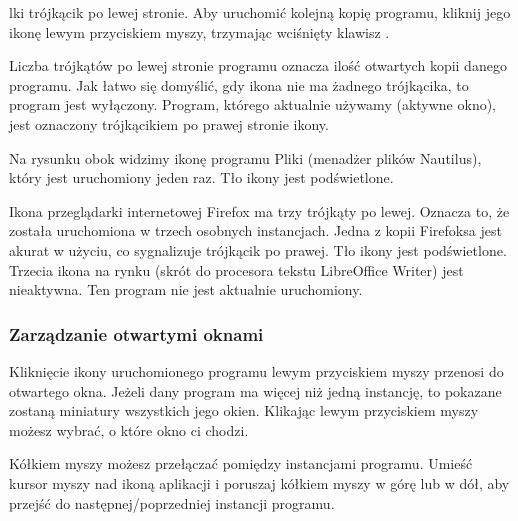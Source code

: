 lki trójkącik po lewej stronie. Aby uruchomić kolejną kopię programu, kliknij jego ikonę lewym przyciskiem myszy, trzymając wciśnięty klawisz .

Liczba trójkątów po lewej stronie programu oznacza ilość otwartych kopii danego programu. Jak łatwo się domyślić, gdy ikona nie ma żadnego trójkącika, to program jest wyłączony. Program, którego aktualnie używamy (aktywne okno), jest oznaczony trójkącikiem po prawej stronie ikony.

Na rysunku obok widzimy ikonę programu Pliki (menadżer plików Nautilus), który jest uruchomiony jeden raz. Tło ikony jest podświetlone.

Ikona przeglądarki internetowej Firefox ma trzy trójkąty po lewej. Oznacza to, że została uruchomiona w trzech osobnych instancjach. Jedna z kopii Firefoksa jest akurat w użyciu, co sygnalizuje trójkącik po prawej. Tło ikony jest podświetlone. Trzecia ikona na rynku (skrót do procesora tekstu LibreOffice Writer) jest nieaktywna. Ten program nie jest aktualnie uruchomiony.

\subsubsection{Zarządzanie otwartymi oknami}
Kliknięcie ikony uruchomionego programu lewym przyciskiem myszy przenosi do otwartego okna. Jeżeli dany program ma więcej niż jedną instancję, to pokazane zostaną miniatury wszystkich jego okien. Klikając lewym przyciskiem myszy możesz wybrać, o które okno ci chodzi. 

Kółkiem myszy możesz przełączać pomiędzy instancjami programu. Umieść kursor myszy nad ikoną aplikacji i poruszaj kółkiem myszy w górę lub w dół, aby przejść do następnej/poprzedniej instancji programu.

